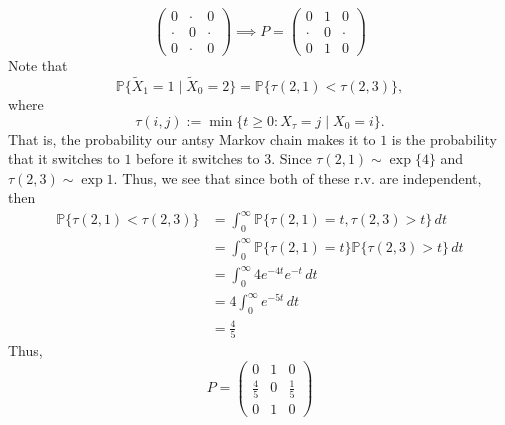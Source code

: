 \documentclass[11pt]{article}
\newcommand{\bbP}{\mathbb{P}}
\begin{document}
\begin{enumerate}
\begin{solution}
\[\begin{pmatrix}
        0 & \cdot & 0\\
        \cdot & 0 & \cdot\\
        0 & \cdot & 0 
    \end{pmatrix} \implies P = \begin{pmatrix}
        0 & 1 & 0\\
        \cdot & 0 & \cdot\\
        0 & 1 & 0
    \end{pmatrix}\]
    Note that 
    \[\bbP\{\tilde{X}_1 = 1 \mid \tilde{X}_0 = 2\} = \bbP\{\tau(2,1) < \tau(2,3)\},\] where 
    \[\tau(i,j):= \min\{t \geq 0 : X_\tau = j \mid X_{0} = i \}.\] That is, the probability our antsy Markov chain makes it to $1$ is the probability that it switches to $1$ before it switches to $3.$  Since $\tau(2,1) \sim \exp\{4\}$ and $\tau(2,3)\sim \exp{1}.$ Thus, we see that since both of these r.v. are independent, then
    \begin{align*}
        \bbP\{\tau(2,1) < \tau(2,3)\} &= \int_0^\infty \bbP\{\tau(2,1) = t, \tau(2,3) >t\}\, dt\\
        &= \int_0^\infty \bbP\{\tau(2,1) = t\}\bbP\{\tau(2,3) > t\}\,dt\\
        &= \int_0^\infty 4e^{-4 t}e^{-t}\, dt\\
        &= 4 \int_0^\infty  e^{-5t}\, dt\\
        &= \frac{4}{5}
    \end{align*}
    Thus, 
    \[\boxed{P = \begin{pmatrix}
        0 & 1 & 0\\
        \frac{4}{5} & 0 & \frac{1}{5}\\
        0 & 1 & 0
    \end{pmatrix}}\]
\end{solution}
\end{enumerate}




\newpage
\end{document}
